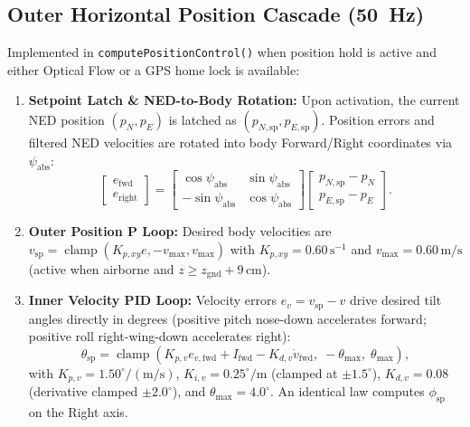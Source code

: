 \documentclass[11pt,a4paper]{article}
\begin{document}
\subsection{Outer Horizontal Position Cascade (50~Hz)}
Implemented in \texttt{computePositionControl()} when position hold is active and either Optical Flow or a GPS home lock is available:
\begin{enumerate}
  \item \textbf{Setpoint Latch \& NED-to-Body Rotation:} Upon activation, the current NED position $(p_N, p_E)$ is latched as $(p_{N,\text{sp}}, p_{E,\text{sp}})$. Position errors and filtered NED velocities are rotated into body Forward/Right coordinates via $\psi_{\text{abs}}$:
  \begin{equation}
    \begin{bmatrix} e_{\text{fwd}} \\ e_{\text{right}} \end{bmatrix} =
    \begin{bmatrix} \cos\psi_{\text{abs}} & \sin\psi_{\text{abs}} \\ -\sin\psi_{\text{abs}} & \cos\psi_{\text{abs}} \end{bmatrix}
    \begin{bmatrix} p_{N,\text{sp}} - p_N \\ p_{E,\text{sp}} - p_E \end{bmatrix}.
  \end{equation}
  \item \textbf{Outer Position P Loop:} Desired body velocities are $v_{\text{sp}} = \operatorname{clamp}(K_{p,xy} e, -v_{\max}, v_{\max})$ with $K_{p,xy} = 0.60\,\text{s}^{-1}$ and $v_{\max} = 0.60\,\text{m/s}$ (active when airborne and $z \ge z_{\text{gnd}} + 9\,\text{cm}$).
  \item \textbf{Inner Velocity PID Loop:} Velocity errors $e_v = v_{\text{sp}} - v$ drive desired tilt angles directly in degrees (positive pitch nose-down accelerates forward; positive roll right-wing-down accelerates right):
  \begin{equation}
    \theta_{\text{sp}} = \operatorname{clamp}\!\left(K_{p,v} e_{v,\text{fwd}} + I_{\text{fwd}} - K_{d,v} \dot{v}_{\text{fwd}},\; -\theta_{\max},\; \theta_{\max}\right),
  \end{equation}
  with $K_{p,v} = 1.50^\circ/(\text{m/s})$, $K_{i,v} = 0.25^\circ/\text{m}$ (clamped at $\pm 1.5^\circ$), $K_{d,v} = 0.08$ (derivative clamped $\pm 2.0^\circ$), and $\theta_{\max} = 4.0^\circ$. An identical law computes $\phi_{\text{sp}}$ on the Right axis.
\end{enumerate}
\end{document}
